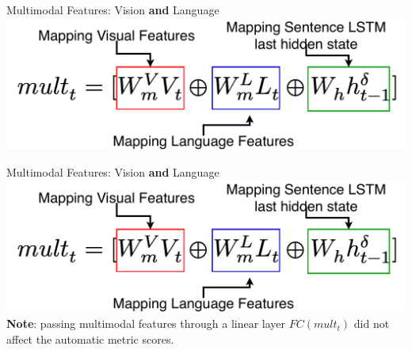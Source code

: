 \documentclass[notes=hide]{beamer}
\begin{document}

\begin{frame}{Multimodal Features: Vision \textbf{and} Language}
\small
\includegraphics[width=1\textwidth]{maphid.pdf}
\end{frame}

\begin{frame}{Multimodal Features: Vision \textbf{and} Language}
\includegraphics[width=1\textwidth]{maphid.pdf}
\\ 
{\vspace{1cm}\textbf{Note}: passing multimodal features through a linear layer $FC(mult_t)$ did not affect the automatic metric scores.}
\end{frame}
\end{document}
